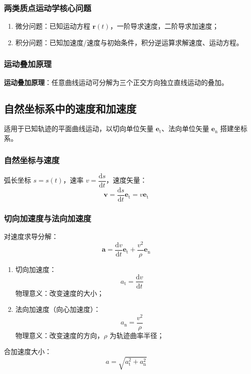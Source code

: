     \subsubsection{两类质点运动学核心问题}
    \begin{enumerate}
        \item 微分问题：已知运动方程 $\boldsymbol{r}(t)$，一阶导求速度，二阶导求加速度；
        \item 积分问题：已知加速度/速度与初始条件，积分逆运算求解速度、运动方程。
    \end{enumerate}
    \subsubsection{运动叠加原理}
    \textbf{运动叠加原理}：任意曲线运动可分解为三个正交方向独立直线运动的叠加。

    \subsection{自然坐标系中的速度和加速度}
    适用于已知轨迹的平面曲线运动，以切向单位矢量 $\boldsymbol{e}_\mathrm{t}$、法向单位矢量 $\boldsymbol{e}_\mathrm{n}$ 搭建坐标系。

    \subsubsection{自然坐标与速度}
    弧长坐标 $s=s(t)$，速率 $v=\dfrac{\mathrm{d}s}{\mathrm{d}t}$，速度矢量：
    \[
    \boldsymbol{v} = \frac{\mathrm{d}s}{\mathrm{d}t}\boldsymbol{e}_\mathrm{t} = v\boldsymbol{e}_\mathrm{t}
    \]

    \subsubsection{切向加速度与法向加速度}
    对速度求导分解：
    \[
    \boldsymbol{a} = \frac{\mathrm{d}v}{\mathrm{d}t}\boldsymbol{e}_\mathrm{t} + \frac{v^2}{\rho}\boldsymbol{e}_\mathrm{n}
    \]
    \begin{enumerate}
        \item 切向加速度：
        \[
        a_\mathrm{t} = \frac{\mathrm{d}v}{\mathrm{d}t}
        \]
        物理意义：改变速度的大小；
        \item 法向加速度（向心加速度）：
        \[
        a_\mathrm{n} = \frac{v^2}{\rho}
        \]
        物理意义：改变速度的方向，$\rho$ 为轨迹曲率半径；
    \end{enumerate}
    合加速度大小：
    \[
    a = \sqrt{a_\mathrm{t}^2 + a_\mathrm{n}^2}
    \]

